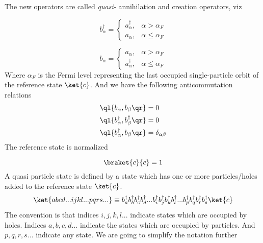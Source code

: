 The new operators are called \emph{quasi-} annihilation and creation operators, viz

\begin{equation}
b_{\alpha}^{\dagger} = \left\{ \begin{array}{rl}
 a_\alpha^{\dagger}, & \alpha > \alpha_F\\
 a_\alpha, & \alpha \leq \alpha_F
       \end{array} \right.
 \label{def:quasi-creation}
\end{equation} 

\begin{equation}
b_{\alpha} = \left\{ \begin{array}{rl}
 a_\alpha, & \alpha > \alpha_F \\
 a_\alpha^{\dagger}, & \alpha \leq \alpha_F
       \end{array} \right.
 \label{def:quasi-annihilation}
\end{equation}
%
Where $\alpha_F$ is the Fermi level representing the last occupied single-particle orbit of the reference state $\ket{c}$. 
%
And we have the following anticommutation relations
\begin{align}
\ql \{ b_{\alpha}, b_{\beta} \qr \} &= 0  \label{def:quasioperator1}\\
\ql \{ b_{\alpha}^{\dagger}, b_{\beta}^{\dagger} \qr \} &= 0  \label{def:quasioperator2}\\
\ql \{ b_{\alpha}^{\dagger}, b_{\beta}  \qr \} &= \delta_{\alpha \beta}  \label{def:quasioperator3}
\end{align}
%
The reference state is normalized

\begin{equation}
 \braket{c}{c} = 1
\end{equation}
%
A quasi particle state is defined by a state which has one or more particles/holes  added to the reference state $\ket{c}$.
%
\begin{equation}
\ket{abcd...ijkl...pqrs...} \equiv b_a^{\dagger}b_b^{\dagger}b_c^{\dagger}b_d^{\dagger}...b_i^{\dagger}b_j^{\dagger}b_k^{\dagger}b_l^{\dagger}...b_p^{\dagger}b_q^{\dagger}b_r^{\dagger}b_s^{\dagger}\ket{c}
 \label{def:manybody-quasiparticle}
\end{equation}
%
The convention is that indices $i,j,k,l...$ indicate states which are occupied by holes. Indices $a,b,c,d...$ indicate the states which are occupied by particles. And $p,q,r,s...$ indicate any state. We are going to simplify the notation further

